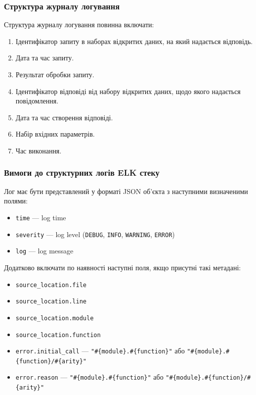 \documentclass{article}
\begin{document}
\subsubsection{Структура журналу логування}

Структура журналу логування повинна включати:

\begin{enumerate}
    \item Ідентифікатор запиту в наборах відкритих даних, на який надається відповідь.
    \item Дата та час запиту.
    \item Результат обробки запиту.
    \item Ідентифікатор відповіді від набору відкритих даних, щодо якого надається повідомлення.
    \item Дата та час створення відповіді.
    \item Набір вхідних параметрів.
    \item Час виконання.
\end{enumerate}

\newpage
\subsubsection{Вимоги до структурних логів ELK стеку}

Лог має бути представлений у форматі JSON об’єкта з наступними визначеними полями:

\begin{itemize}
    \item \texttt{time} — log time
    \item \texttt{severity} — log level (\texttt{DEBUG}, \texttt{INFO}, \texttt{WARNING}, \texttt{ERROR})
    \item \texttt{log} — log message
\end{itemize}

Додатково включати по наявності наступні поля, якщо присутні такі метадані:

\begin{itemize}
    \item \texttt{source\_location.file}
    \item \texttt{source\_location.line}
    \item \texttt{source\_location.module}
    \item \texttt{source\_location.function}
    \item \texttt{error.initial\_call} — \texttt{"\#\{module\}.\#\{function\}"} або \texttt{"\#\{module\}.\#\{function\}/\#\{arity\}"}
    \item \texttt{error.reason} — \texttt{"\#\{module\}.\#\{function\}"} або \texttt{"\#\{module\}.\#\{function\}/\#\{arity\}"}
\end{itemize}
\end{document}
